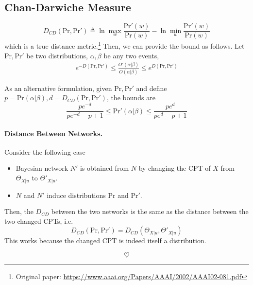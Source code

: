 \documentclass[11pt]{article}
\newcommand{\pr}{\mathrm{Pr}}
\begin{document}
\subsection{Chan-Darwiche Measure}
\begin{equation}
	D_{CD}(\pr, \pr') \triangleq
	\ln\max_w \frac{\pr'(w)}{\pr(w)} - \ln\min_w \frac{\pr'(w)}{\pr(w) }
\end{equation}
which is a true distance metric.\footnote{Original paper: \url{https://www.aaai.org/Papers/AAAI/2002/AAAI02-081.pdf}} Then, we can provide the bound as follows. Let $\pr, \pr'$ be two distributions, $\alpha, \beta$ be any two events, 
\begin{align}
	e^{-D(\pr, \pr')} \leq  \frac{O'(\alpha | \beta)}{O(\alpha | \beta)} \leq e^{D(\pr, \pr')}
\end{align}

As an alternative formulation, given $\pr, \pr'$ and define $p = \pr(\alpha | \beta), d = D_{CD}(\pr, \pr')$, the bounds are 
\begin{equation}
	\frac{pe^{-d}}{pe^{-d} - p + 1} \leq \pr'(\alpha | \beta) \leq \frac{pe^d}{pe^d - p + 1}
\end{equation} 

\paragraph{Distance Between Networks.} Consider the following case
\begin{itemize}
	\item Bayesian network $N'$ is obtained from $N$ by changing the CPT of $X$ from $\Theta_{X | u}$ to $\Theta'_{X | u}$. 
	\item $N$ and $N'$ induce distributions $\pr$ and $\pr'$. 
\end{itemize}
Then, the $D_{CD}$ between the two networks is the same as the distance between the two changed CPTs, i.e. 
\begin{equation}
	D_{CD} (\pr, \pr') = D_{CD} (\Theta_{X | u}, \Theta'_{X | u})
\end{equation}
This works because the changed CPT is indeed itself a distribution. 



















\begin{equation*}
	\heartsuit
\end{equation*}
\end{document}
